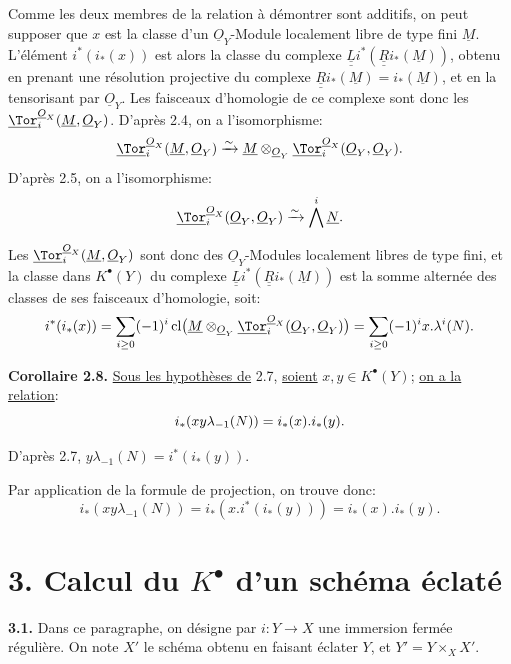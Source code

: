 
Comme les deux membres de la relation à démontrer sont additifs, on peut supposer que \(x\) est la classe d'un \(\underline{O}_Y\)-Module localement libre de type fini \(\underline{M}\). L'élément \(i^*(i_*(x))\) est alors la classe du complexe \(\underline{\underline{L}} i^*(\underline{\underline{R}}i_*(\underline{M}))\), obtenu en prenant une résolution projective du complexe \(\underline{\underline{R}}i_*(\underline{M})=i_*(\underline{M})\), et en la tensorisant par \(\underline{O}_Y\). Les faisceaux d'homologie de ce complexe sont donc les \(\underline{\Tor}_i^{\underline{O}_X}(\underline{M},\underline{O}_Y)\). D'après 2.4, on a l'isomorphisme:
\[
\underline{\Tor}_i^{\underline{O}_X}(\underline{M},\underline{O}_Y)
\xrightarrow{\sim}
\underline{M}\otimes_{\underline{O}_Y}\underline{\Tor}_i^{\underline{O}_X}(\underline{O}_Y,\underline{O}_Y).
\]
D'après 2.5, on a l'isomorphisme:
\[
\underline{\Tor}_i^{\underline{O}_X}(\underline{O}_Y,\underline{O}_Y)
\xrightarrow{\sim}
\bigwedge^i\underline{N}.
\]

Les \(\underline{\Tor}_i^{\underline{O}_X}(\underline{M},\underline{O}_Y)\) sont donc des \(\underline{O}_Y\)-Modules localement libres de type fini, et la classe dans \(K^{\bullet}(Y)\) du complexe \(\underline{\underline{L}} i^*(\underline{\underline{R}}i_*(\underline{M}))\) est la somme alternée des classes de ses faisceaux d'homologie, soit:
\[
i^*(i_*(x))=\sum_{i\ge0}(-1)^i
\operatorname{cl}\bigl(\underline{M}\otimes_{\underline{O}_Y}\underline{\Tor}_i^{\underline{O}_X}(\underline{O}_Y,\underline{O}_Y)\bigr)
=\sum_{i\ge0}(-1)^i x.\lambda^i(N).
\]

\textbf{Corollaire 2.8.} \uline{Sous les hypothèses de} 2.7, \uline{soient} \(x,y\in K^{\bullet}(Y)\); \uline{on a la relation}:
\begin{equation}\notag
i_*(xy\lambda_{-1}(N))=i_*(x).i_*(y).
\end{equation}

D'après 2.7, \(y\lambda_{-1}(N)=i^*(i_*(y))\).

Par application de la formule de projection, on trouve donc:
\[
i_*(xy\lambda_{-1}(N))
=i_*(x.i^*(i_*(y)))
=i_*(x).i_*(y).
\]

\section*{3. Calcul du \texorpdfstring{$K^{\bullet}$}{K} d'un schéma éclaté}

\textbf{3.1.} Dans ce paragraphe, on désigne par \(i:Y\to X\) une immersion fermée régulière. On note \(X'\) le schéma obtenu en faisant éclater \(Y\), et \(Y'=Y\times_X X'\).
